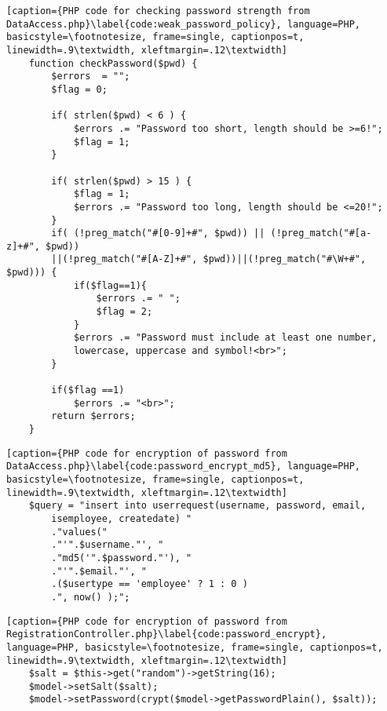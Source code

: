 \begin{lstlisting}[caption={PHP code for checking password strength from DataAccess.php}\label{code:weak_password_policy}, language=PHP, basicstyle=\footnotesize, frame=single, captionpos=t, linewidth=.9\textwidth, xleftmargin=.12\textwidth]
    function checkPassword($pwd) {
        $errors  = "";
        $flag = 0;

        if( strlen($pwd) < 6 ) {
            $errors .= "Password too short, length should be >=6!";
            $flag = 1;
        }

        if( strlen($pwd) > 15 ) {
            $flag = 1;
            $errors .= "Password too long, length should be <=20!";
        }
        if( (!preg_match("#[0-9]+#", $pwd)) || (!preg_match("#[a-z]+#", $pwd))
        ||(!preg_match("#[A-Z]+#", $pwd))||(!preg_match("#\W+#", $pwd))) {
            if($flag==1){
                $errors .= " ";
                $flag = 2;
            }
            $errors .= "Password must include at least one number,
            lowercase, uppercase and symbol!<br>";
        }

        if($flag ==1)
            $errors .= "<br>";
        return $errors;
    }
\end{lstlisting}

\begin{lstlisting}[caption={PHP code for encryption of password from DataAccess.php}\label{code:password_encrypt_md5}, language=PHP, basicstyle=\footnotesize, frame=single, captionpos=t, linewidth=.9\textwidth, xleftmargin=.12\textwidth]
    $query = "insert into userrequest(username, password, email,
        isemployee, createdate) "
        ."values("
        ."'".$username."', "
        ."md5('".$password."'), "
        ."'".$email."', "
        .($usertype == 'employee' ? 1 : 0 )
        .", now() );";
\end{lstlisting}

\begin{lstlisting}[caption={PHP code for encryption of password from RegistrationController.php}\label{code:password_encrypt}, language=PHP, basicstyle=\footnotesize, frame=single, captionpos=t, linewidth=.9\textwidth, xleftmargin=.12\textwidth]
    $salt = $this->get("random")->getString(16);
    $model->setSalt($salt);
    $model->setPassword(crypt($model->getPasswordPlain(), $salt));
\end{lstlisting}

\clearpage